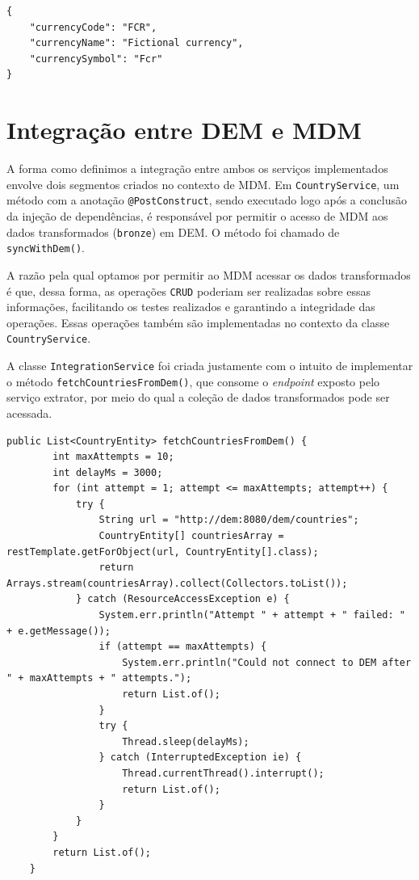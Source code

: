 \documentclass[12pt]{article}
\begin{document}
\begin{lstlisting}[style=json]
{
    "currencyCode": "FCR",
    "currencyName": "Fictional currency",
    "currencySymbol": "Fcr"
}
\end{lstlisting}

\section{Integração entre DEM e MDM}
A forma como definimos a integração entre ambos os serviços implementados envolve dois segmentos criados no contexto de MDM. Em \texttt{CountryService}, um método com a anotação \texttt{@PostConstruct}, sendo executado logo após a conclusão da injeção de dependências, é responsável por permitir o acesso de MDM aos dados transformados (\texttt{bronze}) em DEM. O método foi chamado de \texttt{syncWithDem()}.

\quad A razão pela qual optamos por permitir ao MDM acessar os dados transformados é que, dessa forma, as operações \texttt{CRUD} poderiam ser realizadas sobre essas informações, facilitando os testes realizados e garantindo a integridade das operações. Essas operações também são implementadas no contexto da classe \texttt{CountryService}.

\quad A classe \texttt{IntegrationService} foi criada justamente com o intuito de implementar o método \texttt{fetchCountriesFromDem()}, que consome o \emph{endpoint} exposto pelo serviço extrator, por meio do qual a coleção de dados transformados pode ser acessada.

\begin{lstlisting}[style=vscode]
public List<CountryEntity> fetchCountriesFromDem() {
        int maxAttempts = 10;
        int delayMs = 3000;
        for (int attempt = 1; attempt <= maxAttempts; attempt++) {
            try {
                String url = "http://dem:8080/dem/countries";
                CountryEntity[] countriesArray = restTemplate.getForObject(url, CountryEntity[].class);
                return Arrays.stream(countriesArray).collect(Collectors.toList());
            } catch (ResourceAccessException e) {
                System.err.println("Attempt " + attempt + " failed: " + e.getMessage());
                if (attempt == maxAttempts) {
                    System.err.println("Could not connect to DEM after " + maxAttempts + " attempts.");
                    return List.of();
                }
                try {
                    Thread.sleep(delayMs);
                } catch (InterruptedException ie) {
                    Thread.currentThread().interrupt();
                    return List.of();
                }
            }
        }
        return List.of();
    }
\end{lstlisting}
\end{document}
